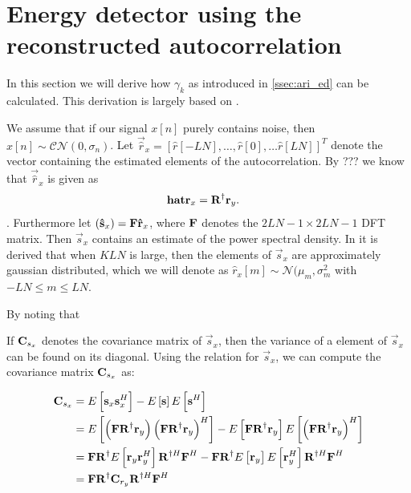 \documentclass[a4paper, openany, oneside]{memoir}
\begin{document}
\section{Energy detector using the reconstructed autocorrelation}\label{sec:ari_ed_deriv}
In this section we will derive how $\gamma_k$ as introduced in \cref{ssec:ari_ed} can be calculated. This derivation is largely based on \cite{ariananda2012compressive}.

We assume that if our signal $x[n]$ purely contains noise, then $x[n] \sim \mathcal{CN}(0,\sigma_n)$. Let $\vec{\hat{r}}_x = [\hat{r}[-LN], \ldots, \hat{r}[0], \ldots \hat{r}[LN]]^T$ denote the vector containing the estimated elements of the autocorrelation. 
By ??? we know that $\vec{\hat{r}}_x$ is given as
\begin{align*}
\boldsymbol{\mathbf{hat{r}}}_x &= \boldsymbol{\mathbf{R}}^{\dagger}\boldsymbol{\mathbf{r}}_y.
\end{align*}.
Furthermore let $(\boldsymbol{\mathbf{\hat{s}}}_x) = \boldsymbol{\mathbf{F}} \boldsymbol{\mathbf{\hat{r}}}_x$, where $\boldsymbol{\mathbf{F}}$ denotes the $2LN-1 \times 2LN-1$ DFT matrix. Then $\vec{s}_x$ contains an estimate of the power spectral density.
In \cite{ariananda2012compressive} it is derived that when $KLN$ is large, then the elements of $\vec{s}_x$ are approximately gaussian distributed, which we will denote as $\hat{r}_x[m] \sim \mathcal{N}(\mu_m,\sigma^2_m$ with $-LN \leq m \leq LN$.

By noting that

If $\boldsymbol{\mathbf{C}}_{s_x}$ denotes the covariance matrix of $\vec{s}_x$, then the variance of a element of $\vec{s}_x$ can be found on its diagonal.
Using the relation for $\vec{s}_x$, we can compute the covariance matrix $\boldsymbol{\mathbf{C}}_{s_x}$ as:

\begin{align*}
\boldsymbol{\mathbf{C}}_{s_x} &= E\left[\boldsymbol{\mathbf{s}}_x\boldsymbol{\mathbf{s}}_x^H\right] - E\left[\boldsymbol{\mathbf{s}}\right]E\left[\boldsymbol{\mathbf{s}}^H\right] \\
&= E\left[\left(\boldsymbol{\mathbf{F}} \boldsymbol{\mathbf{R}}^{\dagger}\boldsymbol{\mathbf{r}}_y\right) \left( \boldsymbol{\mathbf{F}}\boldsymbol{\mathbf{R}}^{\dagger}\boldsymbol{\mathbf{r}}_y\right)^H\right] - E\left[\boldsymbol{\mathbf{F}}\boldsymbol{\mathbf{R}}^{\dagger}\boldsymbol{\mathbf{r}}_y\right]E\left[\left(\boldsymbol{\mathbf{F}}\boldsymbol{\mathbf{R}}^{\dagger}\boldsymbol{\mathbf{r}}_y\right)^H\right] \\
&= \boldsymbol{\mathbf{F}}\boldsymbol{\mathbf{R}}^{\dagger} E\left[ \boldsymbol{\mathbf{r}}_y\boldsymbol{\mathbf{r}}_y^H\right]  \boldsymbol{\mathbf{R}}^{\dagger H}\boldsymbol{\mathbf{F}}^H -  \boldsymbol{\mathbf{F}}\boldsymbol{\mathbf{R}}^{\dagger} E\left[ \boldsymbol{\mathbf{r}}_y\right] E\left[\boldsymbol{\mathbf{r}}_y^H\right]   \boldsymbol{\mathbf{R}}^{\dagger H}\boldsymbol{\mathbf{F}}^H \\
&= \boldsymbol{\mathbf{F}}\boldsymbol{\mathbf{R}}^{\dagger} \boldsymbol{\mathbf{C}}_{r_y} \boldsymbol{\mathbf{R}}^{\dagger H}\boldsymbol{\mathbf{F}}^H
\end{align*}
\end{document}
